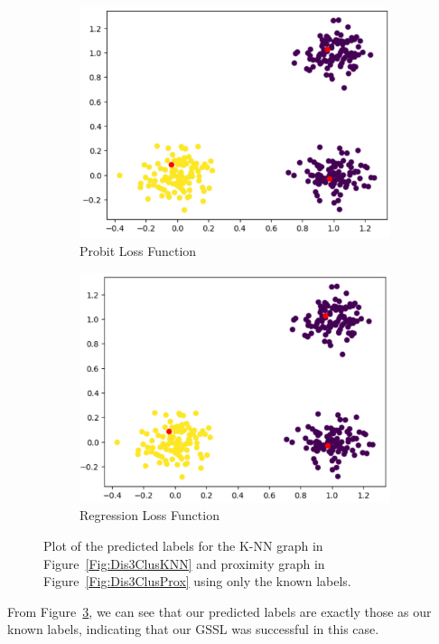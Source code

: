 \documentclass[12pt]{amsart}
\begin{document}
    \begin{figure}[ht] 
  \begin{subfigure}{0.475\linewidth}
    \centering
    \includegraphics[width=0.8\linewidth]{Figures/Dis3ClusKNNPro.png} 
    \caption{Probit Loss Function} 
    \label{Fig:Dis3ClusKNNPro} 
  \end{subfigure}%
  \begin{subfigure}{0.475\linewidth}
    \centering
    \includegraphics[width=0.8\linewidth]{Figures/Dis3ClusKNNReg.png} 
    \caption{Regression Loss Function} 
    \label{Fig:Dis3ClusKNNReg} 
  \end{subfigure} 
  \caption{Plot of the predicted labels for the K-NN graph in Figure~\ref{Fig:Dis3ClusKNN} and proximity graph in Figure~\ref{Fig:Dis3ClusProx}
  using only the known labels.}
  \label{Fig:Dis3ClusKNNRes}
\end{figure}
From Figure~\ref{Fig:Dis3ClusKNNRes}, we can see that our predicted labels are exactly those as our known labels, indicating that our GSSL was successful in this case. 
\end{document}
